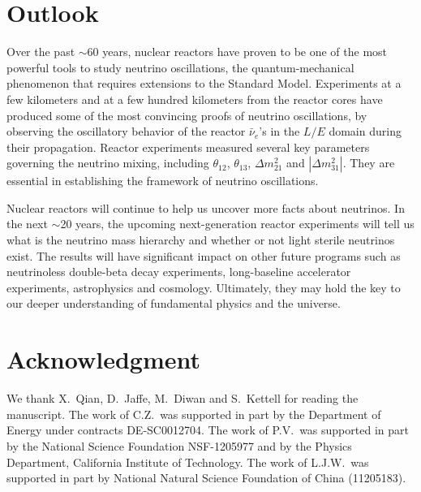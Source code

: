 \documentclass[aps,twocolumn,preprintnumbers,amsmath,superscriptaddress,amssymb,floats,nofootinbib]{revtex4-1}
\begin{document}
\section{Outlook} 
\label{sec:final}

Over the past $\sim$60 years, nuclear reactors have proven to be one of the most powerful tools to study neutrino oscillations, the quantum-mechanical phenomenon that requires extensions to the Standard Model. Experiments at a few kilometers and at a few hundred kilometers from the reactor cores have produced some of the most convincing proofs of neutrino oscillations, by observing the oscillatory behavior of the reactor $\bar\nu_e$'s in the $L/E$ domain during their propagation. Reactor experiments measured several key parameters governing the neutrino mixing, including $\theta_{12}$, $\theta_{13}$, $\Delta{m}^2_{21}$ and $|\Delta{m}^2_{31}|$. They are essential in establishing the framework of neutrino oscillations.

Nuclear reactors will continue to help us uncover more facts about neutrinos. In the next $\sim$20 years, the upcoming next-generation reactor experiments will tell us what is the neutrino mass hierarchy and whether or not light sterile neutrinos exist. The results will have significant impact on other future programs such as neutrinoless double-beta decay experiments, long-baseline accelerator experiments, astrophysics and cosmology. Ultimately, they may hold the key to our deeper understanding of fundamental physics and the universe.

\vspace{12pt}
\section*{Acknowledgment}
We thank X.~Qian, D.~Jaffe, M.~Diwan and S.~Kettell for reading the manuscript.
The work of C.Z.~was supported in part by the Department of Energy under contracts DE-SC0012704.
The work of P.V.~was supported in part by the National Science Foundation NSF-1205977 and by the Physics Department, California Institute of Technology.
The work of L.J.W.~was supported in part by National Natural Science Foundation of China (11205183).

% 
% 
\end{document}
